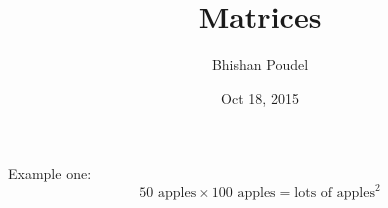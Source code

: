 \documentclass{article}
\title{Matrices}
\author{Bhishan Poudel}
\date{Oct 18, 2015}
\begin{document}
\maketitle

Example one:\\
\begin{displaymath}
50 \text{ apples} \times 100 \text{ apples}
 = \text{lots of apples}^2
\end{displaymath}
\end{document}
